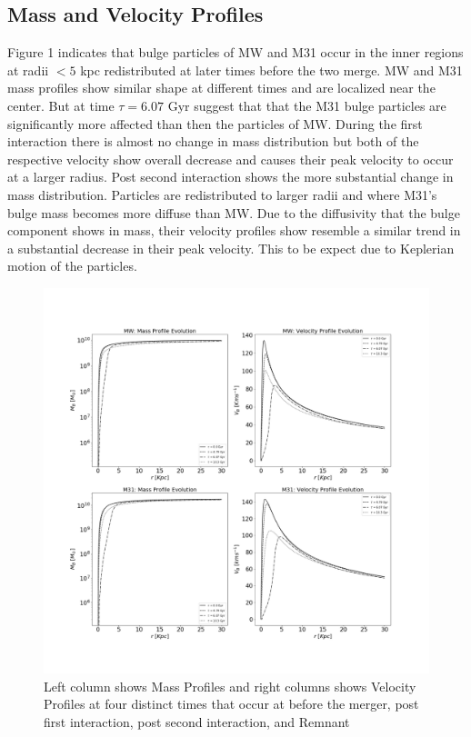 \documentclass[iop]{emulateapj}
\begin{document}
\subsection{Mass and Velocity Profiles}
Figure 1 indicates that bulge particles of MW and M31 occur in the inner regions  at radii $<5$ kpc redistributed at later times before the two merge. MW and M31 mass profiles show similar shape at different times and are localized near the center. But at time $\tau=6.07$ Gyr suggest that that the M31 bulge particles are significantly more affected than then the particles of MW. During the first interaction there is almost no change in mass distribution but both of the respective velocity show overall decrease and causes their peak velocity to occur at a larger radius. Post second interaction shows the more substantial change in mass distribution. Particles are redistributed to larger radii and where M31’s bulge mass becomes more diffuse than MW. Due to the diffusivity that the bulge component shows in mass, their velocity profiles show resemble a similar trend in a substantial decrease in their peak velocity. This to be expect due to Keplerian motion of the particles. 

\begin{figure}[h]
  \centering
  \includegraphics[width=\columnwidth]{MassVelProfile.png}
  \caption{Left column shows Mass Profiles and right columns shows Velocity Profiles at four distinct times that occur at before the merger, post first interaction, post second interaction, and Remnant}
\end{figure}
\end{document}
